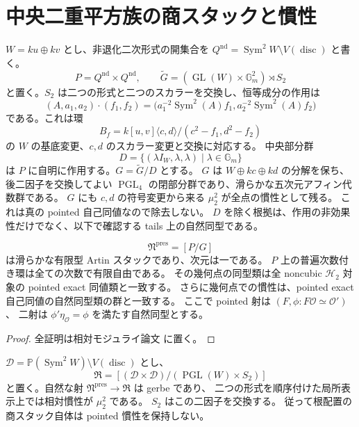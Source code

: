 \section{中央二重平方族の商スタックと慣性}
\label{sec:noncubic-stack}

$W=k u\oplus k v$ とし、非退化二次形式の開集合を
$Q^{\mathrm{nd}}=\operatorname{Sym}^2W\setminus V(\operatorname{disc})$ と書く。
\[
 P=Q^{\mathrm{nd}}\times Q^{\mathrm{nd}},\qquad
 \widetilde G=(\operatorname{GL}(W)\times\mathbb G_m^2)\rtimes S_2
\]
と置く。$S_2$ は二つの形式と二つのスカラーを交換し、恒等成分の作用は
\[
 (A,a_1,a_2)\cdot(f_1,f_2)
 =\bigl(a_1^{-2}\operatorname{Sym}^2(A)f_1,
        a_2^{-2}\operatorname{Sym}^2(A)f_2\bigr)
\]
である。これは環
\[
 B_f=k[u,v]\langle c,d\rangle/(c^2-f_1,d^2-f_2)
\]
の $W$ の基底変更、$c,d$ のスカラー変更と交換に対応する。
中央部分群
\[
 D=\{(\lambda I_W,\lambda,\lambda)\mid\lambda\in\mathbb G_m\}
\]
は $P$ に自明に作用する。$G=\widetilde G/D$ とする。
$G$ は $W\oplus kc\oplus kd$ の分解を保ち、後二因子を交換してよい
$\operatorname{PGL}_4$ の閉部分群であり、滑らかな五次元アフィン代数群である。
$G$ にも $c,d$ の符号変更から来る $\mu_2^2$ が全点の慣性として残る。
これは真の pointed 自己同値なので除去しない。
$D$ を除く根拠は、作用の非効果性だけでなく、以下で確認する tails 上の自然同型である。

\begin{proposition}[表示から構成するスタック]
\label{prop:noncubic-presentation-stack}
\[
 \mathfrak N^{\mathrm{pres}}=[P/G]
\]
は滑らかな有限型 Artin スタックであり、次元は一である。
$P$ 上の普遍次数付き環は全ての次数で有限自由である。
その幾何点の同型類は全 noncubic $\mathcal H_2$ 対象の pointed exact 同値類と一致する。
さらに幾何点での慣性は、pointed exact 自己同値の自然同型類の群と一致する。
ここで pointed 射は $(F,\phi:F\mathcal O\simeq\mathcal O')$、
二射は $\phi'\eta_{\mathcal O}=\phi$ を満たす自然同型とする。
\end{proposition}

\begin{proof}
全証明は相対モジュライ論文 \cite[\texttt{noncubic_stack}]{QuadricModuli2026} に置く。
\end{proof}

\begin{proposition}[根配置スタックへの射]
\label{prop:noncubic-sign-gerbe}
$\mathcal D=\mathbb P(\operatorname{Sym}^2W)\setminus V(\operatorname{disc})$ とし、
\[
 \mathfrak R=[(\mathcal D\times\mathcal D)/
       (\operatorname{PGL}(W)\times S_2)]
\]
と置く。自然な射 $\mathfrak N^{\mathrm{pres}}\to\mathfrak R$ は gerbe であり、
二つの形式を順序付けた局所表示上では相対慣性が $\mu_2^2$ である。
$S_2$ はこの二因子を交換する。
従って根配置の商スタック自体は pointed 慣性を保持しない。
\end{proposition}

